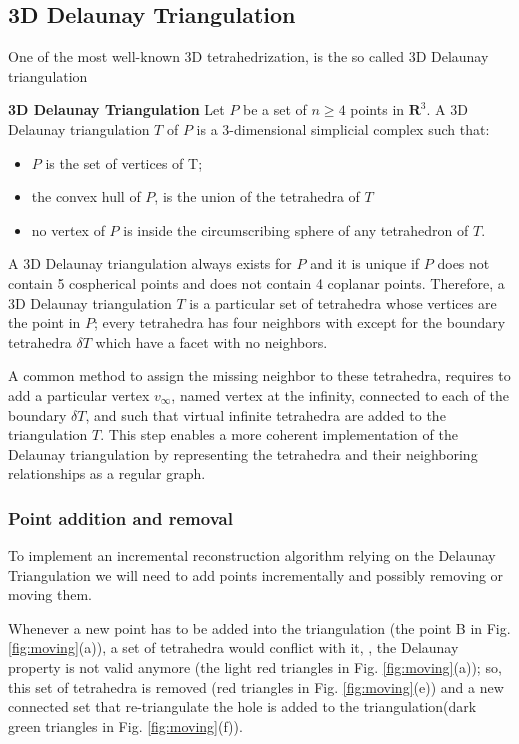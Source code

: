 \subsection{3D Delaunay Triangulation}
One of the most well-known 3D tetrahedrization, is the so called 3D Delaunay triangulation

\begin{mydef}
 \textbf{3D Delaunay Triangulation}
 Let $\mathit{P}$ be a set of $n \geq 4$ points in $\mathbf{R}^3$. A 3D Delaunay triangulation $T$ of $\mathit{P}$ is a 3-dimensional simplicial complex such that:
 \begin{itemize}
  \item $\mathit{P}$ is the set of vertices of T;
  \item the convex hull of $\mathit{P}$, is the union of the tetrahedra of $T$
  \item no vertex of $\mathit{P}$ is inside the circumscribing sphere of any tetrahedron of $T$.
 \end{itemize}

 
\end{mydef}

A 3D Delaunay triangulation always exists for $\mathit{P}$ and it is unique if  $\mathit{P}$ does not contain 5 cospherical points and does not contain 4 coplanar points.
Therefore, a 3D Delaunay triangulation $T$ is a particular set of tetrahedra whose vertices are the point in $\mathit{P}$; every tetrahedra has four neighbors with except for the boundary tetrahedra $\delta T$ which have a facet with no neighbors. 

A common method to assign the missing neighbor to these tetrahedra, requires to add a particular vertex $v_\infty$, named vertex at the infinity, connected to each of the boundary $\delta T$, and such that virtual infinite tetrahedra are added to the triangulation $T$. 
This step enables a more coherent implementation of the Delaunay triangulation by representing the tetrahedra and their neighboring relationships as a regular graph.

\subsubsection{Point addition and removal}
To implement an incremental reconstruction algorithm relying on the Delaunay Triangulation we will need to add points incrementally and possibly removing or moving them.

Whenever a new point has to be added into the triangulation  (the point B in Fig. \ref{fig:moving}(a)), a set of tetrahedra would conflict with it, \ie, the Delaunay property is not valid anymore (the light red triangles in Fig. \ref{fig:moving}(a)); so, this set of tetrahedra  is removed  (red triangles in Fig. \ref{fig:moving}(e)) and a new connected set that re-triangulate the hole is added to the triangulation(dark green triangles in Fig. \ref{fig:moving}(f)).

